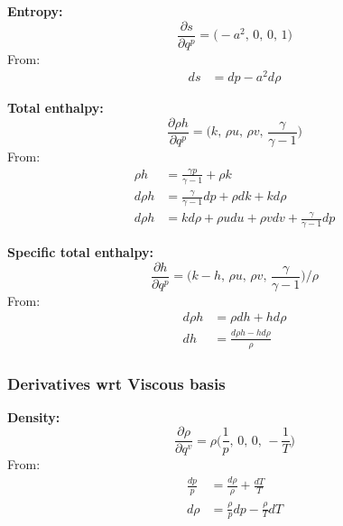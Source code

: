 \documentclass{article}
\begin{document}
\textbf{Entropy:}
\begin{equation*}
    \frac{\partial s}{\partial q^p} = \big(-a^2,\, 0,\, 0,\, 1 \big)
\end{equation*}
From:
\begin{equation*}
    \begin{split}
        ds & = dp - a^2d\rho
    \end{split}
\end{equation*}

\textbf{Total enthalpy:}
\begin{equation*}
    \frac{\partial \rho h}{\partial q^p} = \big( k,\, \rho u,\, \rho v,\, \frac{\gamma}{\gamma-1} \big)
\end{equation*}
From:
\begin{equation*}
    \begin{split}
        \rho h  & = \frac{\gamma p}{\gamma-1} + \rho k \\
        d\rho h & = \frac{\gamma}{\gamma-1} dp + \rho dk + kd\rho \\
        d\rho h & = kd\rho + \rho udu + \rho vdv + \frac{\gamma}{\gamma-1} dp
    \end{split}
\end{equation*}

\textbf{Specific total enthalpy:}
\begin{equation*}
    \frac{\partial h}{\partial q^p} = \big( k-h,\, \rho u,\, \rho v,\, \frac{\gamma}{\gamma-1} \big)/\rho
\end{equation*}
From:
\begin{equation*}
    \begin{split}
        d\rho h & = \rho dh + h d\rho \\
        dh      & = \frac{d\rho h - hd\rho}{\rho}
    \end{split}
\end{equation*}


\subsubsection{Derivatives wrt Viscous basis}

\textbf{Density:}
\begin{equation*}
    \frac{\partial \rho}{\partial q^v} = \rho\big( \frac{1}{p},\, 0,\, 0,\, -\frac{1}{T} \big)
\end{equation*}
From:
\begin{equation*}
    \begin{split}
        \frac{dp}{p}       & = \frac{d\rho}{\rho} + \frac{dT}{T} \\
        d\rho & = \frac{\rho}{p}dp - \frac{\rho}{T}dT
    \end{split}
\end{equation*}
\end{document}
